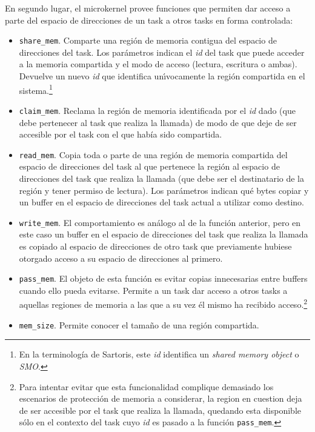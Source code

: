 \documentclass[11pt, letterpaper, twoside]{book}
\begin{document}
En segundo lugar, el microkernel provee funciones que permiten dar acceso a parte del espacio de direcciones de un task a otros tasks en forma controlada:

\begin{itemize}
\item[] \texttt{share\_mem}. Comparte una regi\'on de memoria contigua del espacio de direcciones del task. Los par\'ametros indican el \emph{id} del task que puede acceder a la memoria compartida y el modo de acceso (lectura, escritura o ambas). Devuelve un nuevo \emph{id} que identifica un\'\i{}vocamente la regi\'on compartida en el sistema.\footnote{En la terminolog\'ia de Sartoris, este \emph{id} identifica un \emph{shared memory object} o \emph{SMO}.}
\item[] \texttt{claim\_mem}. Reclama la regi\'on de memoria identificada por el \emph{id} dado (que debe pertenecer al task que realiza la llamada) de modo de que deje de ser accesible por el task con el que hab\'ia sido compartida.
\item[] \texttt{read\_mem}. Copia toda o parte de una regi\'on de memoria compartida del espacio de direcciones del task al que pertenece la regi\'on al espacio de direcciones del task que realiza la llamada (que debe ser el destinatario de la regi\'on y tener permiso de lectura). Los par\'ametros indican qu\'e bytes copiar y un buffer en el espacio de direcciones del task actual a utilizar como destino.
\item[] \texttt{write\_mem}. El comportamiento es an\'alogo al de la funci\'on anterior, pero en este caso un buffer en el espacio de direcciones del task que realiza la llamada es copiado al espacio de direcciones de otro task que previamente hubiese otorgado acceso a su espacio de direcciones al primero.
\item[] \texttt{pass\_mem}. El objeto de esta funci\'on es evitar copias innecesarias entre buffers cuando ello pueda evitarse. Permite a un task dar acceso a otros tasks a aquellas regiones de memoria a las que a su vez \'el mismo ha recibido acceso.\footnote{Para intentar evitar que esta funcionalidad complique demasiado los escenarios de protecci\'on de memoria a considerar, la region en cuestion deja de ser accesible por el task que realiza la llamada, quedando esta disponible s\'olo en el contexto del task cuyo \emph{id} es pasado a la funci\'on \texttt{pass\_mem}.}
\item[] \texttt{mem\_size}. Permite conocer el tama\~no de una regi\'on compartida.
\end{itemize}
\end{document}

